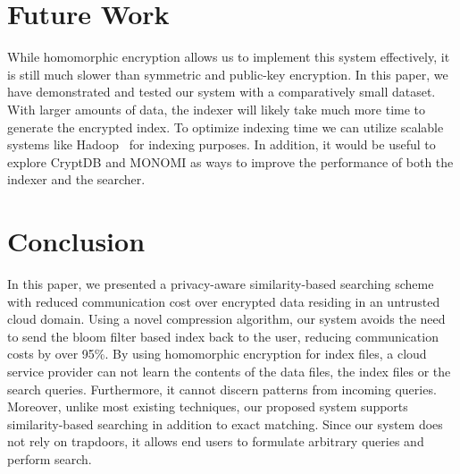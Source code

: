 \section{Future Work}
\label{sec:futurework}

While homomorphic encryption allows us to implement this system effectively, 
it is still much slower than symmetric and public-key encryption.
In this paper, we have demonstrated and tested our system with a comparatively 
small dataset. With larger amounts of data, the indexer will likely take 
much more time to generate the
encrypted index. To optimize indexing time we can
utilize scalable systems like Hadoop~\cite{hadoop} for indexing
purposes. In addition, it would be useful to explore CryptDB and MONOMI as
ways to improve the performance of both the indexer and the searcher.


\section{Conclusion}
\label{sec:conclusion}

In this paper, we presented a privacy-aware similarity-based searching scheme
with reduced communication cost over encrypted data residing in an untrusted
cloud domain. Using a novel compression 
algorithm, our system avoids the need to send the bloom filter based index back to the 
user, reducing communication costs by over 95\%.
By using homomorphic encryption for index files, a cloud service provider can not learn the contents of 
the data files, the index files or the search queries. Furthermore, it cannot 
discern patterns from incoming queries. Moreover, unlike most existing techniques, our
proposed system supports similarity-based searching in addition to exact matching.
Since our system does not rely on trapdoors, it allows end users to formulate
arbitrary queries and perform search. 
